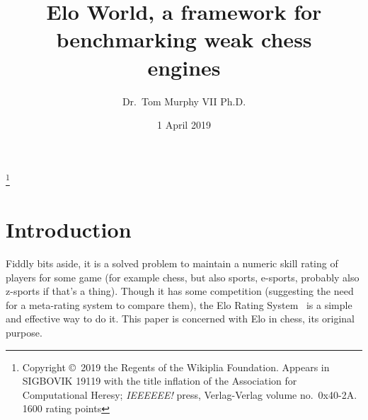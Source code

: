 \documentclass[10pt,preprint,twocolumn]{acmart}
\begin{document}
 



\title[Elo World]{Elo World, a framework for \\ benchmarking weak chess \\ engines}
\author{Dr.~Tom Murphy VII Ph.D.}
\thanks{Copyright \copyright\ 2019 the Regents of the Wikiplia Foundation.
Appears in SIGBOVIK 19119 with the
%
title inflation
%
of the Association for Computational Heresy; {\em IEEEEEE!}
press, Verlag-Verlag volume no.~0x40-2A. 1600 rating points}




\newcommand\checkmate{\hspace{-.05em}\raisebox{.4ex}{\tiny\bf ++}}

\renewcommand\th{\ensuremath{{}^{\textrm{th}}}}
\newcommand\st{\ensuremath{{}^{\textrm{st}}}}
\newcommand\rd{\ensuremath{{}^{\textrm{rd}}}}
\newcommand\nd{\ensuremath{{}^{\textrm{nd}}}}
\newcommand\at{\ensuremath{\scriptstyle @}}

\date{1 April 2019}

\maketitle \thispagestyle{empty}

\section{Introduction}

Fiddly bits aside, it is a solved problem to maintain a numeric skill
rating of players for some game (for example chess, but also sports,
e-sports, probably also z-sports if that's a thing). Though it has
some competition (suggesting the need for a meta-rating system to
compare them), the Elo Rating System~\cite{elo1978rating} is a simple
and effective way to do it. This paper is concerned with Elo in chess,
its original purpose.
\end{document}
